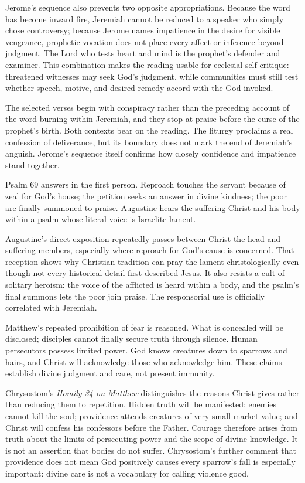 Jerome's sequence also prevents two opposite appropriations. Because the word has become inward fire, Jeremiah cannot be reduced to a speaker who simply chose controversy; because Jerome names impatience in the desire for visible vengeance, prophetic vocation does not place every affect or inference beyond judgment. The Lord who tests heart and mind is the prophet's defender and examiner. This combination makes the reading usable for ecclesial self-critique: threatened witnesses may seek God's judgment, while communities must still test whether speech, motive, and desired remedy accord with the God invoked.

The selected verses begin with conspiracy rather than the preceding account of the word burning within Jeremiah, and they stop at praise before the curse of the prophet's birth. Both contexts bear on the reading. The liturgy proclaims a real confession of deliverance, but its boundary does not mark the end of Jeremiah's anguish. Jerome's sequence itself confirms how closely confidence and impatience stand together.

Psalm 69 answers in the first person. Reproach touches the servant because of zeal for God's house; the petition seeks an answer in divine kindness; the poor are finally summoned to praise. Augustine hears the suffering Christ and his body within a psalm whose literal voice is Israelite lament.

Augustine's direct exposition repeatedly passes between Christ the head and suffering members, especially where reproach for God's cause is concerned. That reception shows why Christian tradition can pray the lament christologically even though not every historical detail first described Jesus. It also resists a cult of solitary heroism: the voice of the afflicted is heard within a body, and the psalm's final summons lets the poor join praise. The responsorial use is officially correlated with Jeremiah.

Matthew's repeated prohibition of fear is reasoned. What is concealed will be disclosed; disciples cannot finally secure truth through silence. Human persecutors possess limited power. God knows creatures down to sparrows and hairs, and Christ will acknowledge those who acknowledge him. These claims establish divine judgment and care, not present immunity.

Chrysostom's \emph{Homily 34 on Matthew} distinguishes the reasons Christ gives rather than reducing them to repetition. Hidden truth will be manifested; enemies cannot kill the soul; providence attends creatures of very small market value; and Christ will confess his confessors before the Father. Courage therefore arises from truth about the limits of persecuting power and the scope of divine knowledge. It is not an assertion that bodies do not suffer. Chrysostom's further comment that providence does not mean God positively causes every sparrow's fall is especially important: divine care is not a vocabulary for calling violence good.

